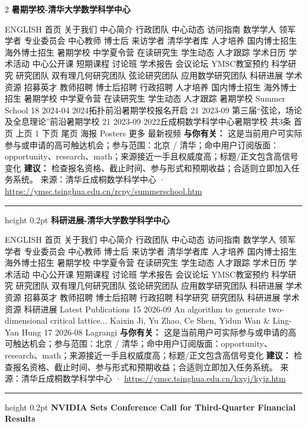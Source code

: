 \documentclass[10.5pt]{ctexart}
\begin{document}
\begin{multicols}{2}
{\large\bfseries 暑期学校-清华大学数学科学中心}\par
ENGLISH 首页 关于我们 中心简介 行政团队 中心动态 访问指南 数学学人 领军学者 专业委员会 中心教师 博士后 来访学者 清华学者库 人才培养 国内博士招生 海外博士招生 暑期学校 中学夏令营 在读研究生 学生动态 人才跟踪 学术日历 学术活动 中心公开课 短期课程 讨论班 学术报告 会议论坛 YMSC教室预约 科学研究 研究团队 双有理几何研究团队 弦论研究团队 应用数学研究团队 科研进展 学术资源 招募英才 教师招聘 博士后招聘 行政招聘 人才培养 国内博士招生 海外博士招生 暑期学校 中学夏令营 在读研究生 学生动态 人才跟踪 暑期学校 Summer School 18 2024-04 2024拓扑前沿暑期学校报名开启 21 2023-09 第三届“弦论，场论及全息理论”前沿暑期学校 21 2023-09 2022丘成桐数学科学中心暑期学校 共3条 首页 上页 1 下页 尾页 海报 Posters 更多 最新视频
\textbf{与你有关：} 这是当前用户可实际参与或申请的高可触达机会；参与范围：北京 / 清华；命中用户订阅版面：opportunity、research、math；来源接近一手且权威度高；标题/正文包含高信号变化
\textbf{建议：} 检查报名资格、截止时间、参与形式和预期收益；合适则立即加入任务系统。
{\footnotesize\color{ormuted} 来源：清华丘成桐数学科学中心 · \url{https://ymsc.tsinghua.edu.cn/rcpy/summerschool.htm}}
\vspace{2mm}
\hrule height 0.2pt
\vspace{2mm}
{\large\bfseries 科研进展-清华大学数学科学中心}\par
ENGLISH 首页 关于我们 中心简介 行政团队 中心动态 访问指南 数学学人 领军学者 专业委员会 中心教师 博士后 来访学者 清华学者库 人才培养 国内博士招生 海外博士招生 暑期学校 中学夏令营 在读研究生 学生动态 人才跟踪 学术日历 学术活动 中心公开课 短期课程 讨论班 学术报告 会议论坛 YMSC教室预约 科学研究 研究团队 双有理几何研究团队 弦论研究团队 应用数学研究团队 科研进展 学术资源 招募英才 教师招聘 博士后招聘 行政招聘 科学研究 研究团队 科研进展 学术资源 科研进展 Latest Publications 15 2026-09 An algorithm to generate two-dimensional critical lattice... Kaixin Ji, Yu Zhao, Ce Shen, Yidun Wan \& Ling-Yan Hung 17 2026-08 Lagrangi
\textbf{与你有关：} 这是当前用户可实际参与或申请的高可触达机会；参与范围：北京 / 清华；命中用户订阅版面：opportunity、research、math；来源接近一手且权威度高；标题/正文包含高信号变化
\textbf{建议：} 检查报名资格、截止时间、参与形式和预期收益；合适则立即加入任务系统。
{\footnotesize\color{ormuted} 来源：清华丘成桐数学科学中心 · \url{https://ymsc.tsinghua.edu.cn/kxyj/kyjz.htm}}
\vspace{2mm}
\hrule height 0.2pt
\vspace{2mm}
{\large\bfseries NVIDIA Sets Conference Call for Third-Quarter Financial Results}\par

\end{multicols}
\end{document}
